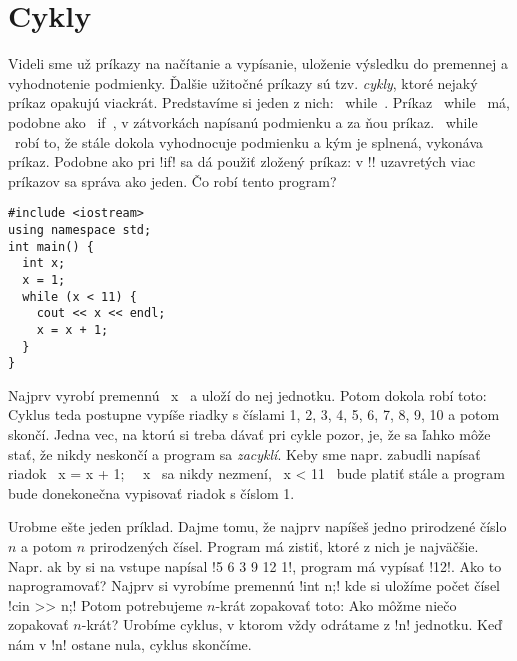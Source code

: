 \chapter{Cykly}

Videli sme už príkazy na načítanie a vypísanie, uloženie výsledku do premennej
a vyhodnotenie podmienky. Ďalšie užitočné príkazy sú tzv. {\em cykly}, ktoré
nejaký príkaz opakujú viackrát. Predstavíme si jeden z nich: \prg~while~.
Príkaz \prg~while~ má, podobne ako \prg~if~, v zátvorkách napísanú
podmienku a za ňou príkaz. \prg ~while ~robí to, že stále dokola vyhodnocuje
podmienku a kým je splnená, vykonáva príkaz. Podobne ako pri \prg!if!
sa dá použiť zložený príkaz: v \prg!{}! uzavretých viac príkazov
sa správa ako jeden. Čo robí tento program?

\begin{lstlisting}
#include <iostream>
using namespace std;
int main() {
  int x;
  x = 1;
  while (x < 11) {
    cout << x << endl;
    x = x + 1;
  }
}
\end{lstlisting}

Najprv vyrobí premennú \prg~x~ a uloží do nej jednotku. Potom dokola robí toto:
 Cyklus teda postupne vypíše riadky s 
číslami 1, 2, 3, 4, 5, 6, 7, 8, 9, 10 a potom skončí. Jedna vec, na ktorú si treba dávať pri 
cykle pozor, je, že sa ľahko môže stať, že nikdy neskončí a program sa {\em zacyklí}.
Keby sme napr. zabudli napísať riadok \prg~x = x + 1;~ \prg~x~ sa nikdy nezmení,
\prg~x < 11~ bude platiť stále a program bude donekonečna vypisovať riadok s číslom 1.

Urobme ešte jeden príklad. Dajme tomu, že najprv napíšeš jedno
prirodzené číslo $n$ a potom $n$ prirodzených čísel. Program má zistiť,
ktoré z nich je najväčšie. Napr. ak by si na vstupe napísal \prg!5 6 3 9 12 1!, 
program má vypísať \prg!12!.  Ako to naprogramovať? Najprv si vyrobíme
premennú \prg!int n;! kde si uložíme počet čísel \prg!cin >> n;! Potom
potrebujeme $n$-krát zopakovať toto:  
  Ako
môžme niečo zopakovať $n$-krát? Urobíme cyklus, v ktorom vždy odrátame z
\prg!n!  jednotku.  Keď nám v \prg!n! ostane nula, cyklus skončíme.

